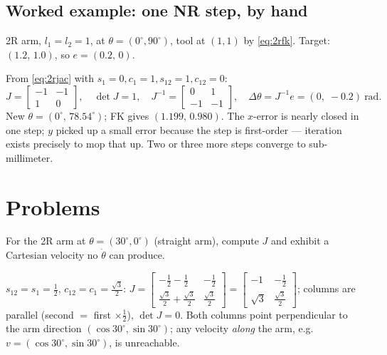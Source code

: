 \subsection{Worked example: one NR step, by hand}

2R arm, $l_1 = l_2 = 1$, at $\theta = (0^\circ, 90^\circ)$, tool at $(1, 1)$ by
\eqref{eq:2rfk}. Target: $(1.2,\, 1.0)$, so $e = (0.2,\, 0)$.

From \eqref{eq:2rjac} with $s_1{=}0, c_1{=}1, s_{12}{=}1, c_{12}{=}0$:
\[
  J = \begin{bmatrix} -1 & -1 \\ 1 & 0 \end{bmatrix}, \quad \det J = 1, \quad
  J^{-1} = \begin{bmatrix} 0 & 1 \\ -1 & -1 \end{bmatrix}, \quad
  \Delta\theta = J^{-1} e = (0,\; -0.2)\ \text{rad}.
\]
New $\theta = (0^\circ,\, 78.54^\circ)$; FK gives $(1.199,\, 0.980)$. The $x$-error is nearly
closed in one step; $y$ picked up a small error because the step is first-order --- iteration
exists precisely to mop that up. Two or three more steps converge to sub-millimeter.

\section{Problems}

\begin{problem}
For the 2R arm at $\theta = (30^\circ, 0^\circ)$ (straight arm), compute $J$ and exhibit a
Cartesian velocity no $\dot\theta$ can produce.
\end{problem}
\begin{answer}
$s_{12}=s_1=\tfrac12$, $c_{12}=c_1=\tfrac{\sqrt3}2$:
$J = \begin{bmatrix} -\tfrac12 - \tfrac12 & -\tfrac12 \\ \tfrac{\sqrt3}2 + \tfrac{\sqrt3}2 &
\tfrac{\sqrt3}2\end{bmatrix}
   = \begin{bmatrix} -1 & -\tfrac12 \\ \sqrt3 & \tfrac{\sqrt3}2 \end{bmatrix}$;
columns are parallel (second $=$ first $\times \tfrac12$), $\det J = 0$. Both columns point
perpendicular to the arm direction $(\cos30^\circ, \sin30^\circ)$; any velocity \emph{along}
the arm, e.g.\ $v = (\cos30^\circ, \sin30^\circ)$, is unreachable.
\end{answer}

